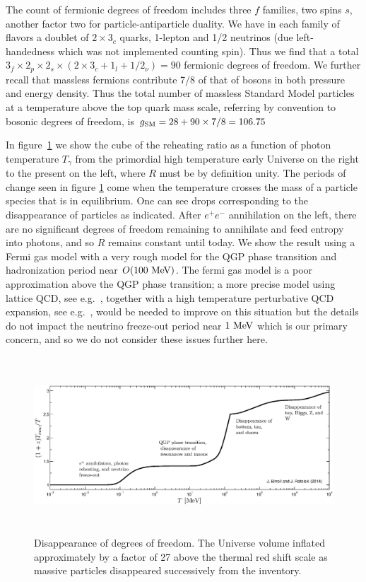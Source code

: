 The count of fermionic degrees of freedom includes three $f$ families, two spins $s$, another factor two for particle-antiparticle duality. We have in each family of flavors a doublet of $2\times 3_c$ quarks, 1-lepton and 1/2 neutrinos (due left-handedness which was not implemented counting spin). Thus we find that a total $3_f\times 2_p\times 2_s\times(2\times 3_c+1_l+1/2_\nu)=90$ fermionic degrees of freedom. We further recall that massless fermions contribute 7/8 of that of bosons in both pressure and energy density. Thus the total number of massless Standard Model particles at a temperature above the top quark mass scale, referring by convention to bosonic degrees of freedom, is $g_{\rm SM}=28+90\times 7/8=106.75$ 



In figure~\ref{fig:dof} we show the cube of the reheating ratio  as a function of photon temperature $T_\gamma$ from the primordial high temperature early Universe on the right to the present on the left, where $R$ must be by definition unity. The periods of change seen in figure \ref{fig:dof} come when the temperature crosses the mass of a particle species that is in equilibrium. One can see drops corresponding to the disappearance of particles as indicated. After $e^+e^-$ annihilation on the left, there are no significant degrees of freedom remaining to annihilate and feed entropy into photons, and so $R$ remains constant until today. We show the result using a Fermi gas model with a very rough model for the QGP phase transition and hadronization period near $O(100\text{ MeV})$. The fermi gas model is a poor approximation above the QGP phase transition; a more precise model using lattice QCD, see e.g.~\cite{Borsanyi:2013bia}, together with a high temperature perturbative QCD expansion, see e.g.~\cite{letessier2002hadrons}, would be needed to improve on this situation but the details do not impact the neutrino freeze-out period near $1\text{ MeV}$ which is our primary concern, and so we do not consider these issues further here.

\begin{figure} 
\centerline{\hspace*{0.4cm}\includegraphics[height=6.6cm]{04-birrell/ErasOfUniverse/z_T_plot.eps}}
\caption{Disappearance of degrees of freedom. The Universe volume inflated approximately by a factor of 27 above the thermal red shift scale as massive particles disappeared successively from the inventory.\label{fig:dof}}
 \end{figure}



